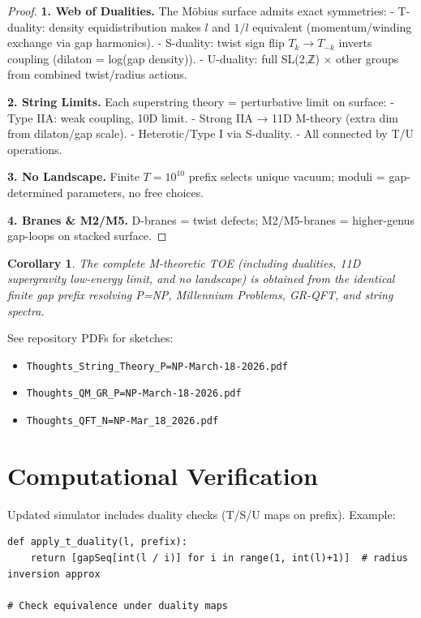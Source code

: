 \documentclass[11pt]{article}
\newtheorem{corollary}{Corollary}[section]
\begin{document}
\begin{proof}
\textbf{1. Web of Dualities.} The Möbius surface admits exact symmetries:
- T-duality: density equidistribution makes $l$ and $1/l$ equivalent (momentum/winding exchange via gap harmonics).
- S-duality: twist sign flip $T_k \to T_{-k}$ inverts coupling (dilaton = log(gap density)).
- U-duality: full SL(2,ℤ) × other groups from combined twist/radius actions.

\textbf{2. String Limits.} Each superstring theory = perturbative limit on surface:
- Type IIA: weak coupling, 10D limit.
- Strong IIA → 11D M-theory (extra dim from dilaton/gap scale).
- Heterotic/Type I via S-duality.
- All connected by T/U operations.

\textbf{3. No Landscape.} Finite $T=10^{10}$ prefix selects unique vacuum; moduli = gap-determined parameters, no free choices.

\textbf{4. Branes \& M2/M5.} D-branes = twist defects; M2/M5-branes = higher-genus gap-loops on stacked surface.
\end{proof}

\begin{corollary}
The complete M-theoretic TOE (including dualities, 11D supergravity low-energy limit, and no landscape) is obtained from the identical finite gap prefix resolving P=NP, Millennium Problems, GR-QFT, and string spectra.
\end{corollary}

See repository PDFs for sketches:
\begin{itemize}
    \item \texttt{Thoughts\_String\_Theory\_P=NP-March-18-2026.pdf}
    \item \texttt{Thoughts\_QM\_GR\_P=NP-March-18-2026.pdf}
    \item \texttt{Thoughts\_QFT\_N=NP-Mar\_18\_2026.pdf}
\end{itemize}

\section{Computational Verification}
Updated simulator includes duality checks (T/S/U maps on prefix). Example:
\begin{lstlisting}
def apply_t_duality(l, prefix):
    return [gapSeq[int(l / i)] for i in range(1, int(l)+1)]  # radius inversion approx

# Check equivalence under duality maps
\end{lstlisting}
\end{document}
